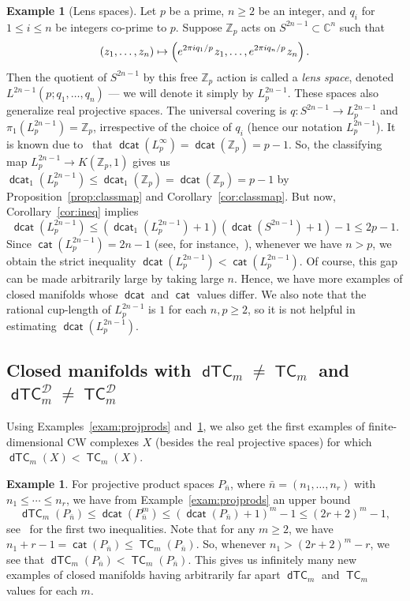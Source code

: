 \documentclass[amscd,amssymb,verbatim,11pt]{amsart}
\theoremstyle{plain}
\theoremstyle{definition}
\newtheorem{ex}[thm]{Example}
\DeclareMathOperator{\cat}{{\mathsf{cat}}}
\DeclareMathOperator{\TC}{{\mathsf{TC}}}
\DeclareMathOperator{\dcat}{{\mathsf{dcat}}}
\DeclareMathOperator{\dTC}{{\mathsf{dTC}}}
\newcommand{\D}{\mathcal{D}}
\def\C{{\mathbb C}}
\def\Z{{\mathbb Z}}
\begin{document}
\begin{ex}[Lens spaces]\label{exam:lens spaces}
Let $p$ be a prime, $n\ge 2$ be an integer, and $q_i$ for $1\le i \le n$ be integers co-prime to $p$. Suppose $\Z_p$ acts on $S^{2n-1}\subset \C^n$ such that
\[
(z_1,\ldots,z_n)\mapsto \left(e^{2\pi iq_1/p}\hspace{0.3mm}z_1,\ldots,e^{2\pi iq_n/p}\hspace{0.3mm}z_n\right).
\]
Then the quotient of $S^{2n-1}$ by this free $\Z_p$ action is called a \emph{lens space}, denoted $L^{2n-1}(p;q_1,\ldots,q_n)$ --- we will denote it simply by $L^{2n-1}_p$. These spaces also generalize real projective spaces. The universal covering is $q\colon S^{2n-1}\to L^{2n-1}_p$ and $\pi_1(L^{2n-1}_p)=\Z_p$, irrespective of the choice of $q_i$ (hence our notation $L^{2n-1}_p$). It is known due to~\cite{Dr,KW2} that $\dcat(L^{\infty}_p)=\dcat(\Z_p)=p-1$. So, the classifying map $L^{2n-1}_p\to K(\Z_p,1)$ gives us $\dcat_1(L^{2n-1}_p)\le \dcat_1(\Z_p)=\dcat(\Z_p)=p-1$ by Proposition~\ref{prop:classmap} and Corollary~\ref{cor:classmap}. But now, Corollary~\ref{cor:ineq} implies
\[
\dcat(L^{2n-1}_p)\le(\dcat_1(L^{2n-1}_p)+1)(\dcat(S^{2n-1})+1)-1\le 2p-1.
\]
Since $\cat(L^{2n-1}_p)=2n-1$ (see, for instance,~\cite[Example 9.29]{CLOT}), whenever 
we have $n>p$, we obtain the strict inequality $\dcat(L^{2n-1}_p)<\cat(L^{2n-1}_p)$. Of course, this gap can be made arbitrarily large by taking large $n$. Hence, we have more examples of closed manifolds whose $\dcat$ and $\cat$ values differ. We also note that the rational cup-length of $L^{2n-1}_p$ is $1$ for each $n,p\ge 2$, so it is not helpful in estimating $\dcat(L^{2n-1}_p)$.
\end{ex}

\subsection{Closed manifolds with $\dTC_m\ne\TC_m$ and $\dTC^{\D}_m\ne \TC^{\D}_m$}\label{subsec: dTC ne TC} 
Using Examples~\ref{exam:projprods} and~\ref{exam:lens spaces}, we also get the first examples of finite-dimensional CW complexes $X$ (besides the real projective spaces) for which $\dTC_m(X)<\TC_m(X)$. 

\begin{ex}\label{exam: dtc and tc differ}
    For projective product spaces $P_{\bar n}$, where $\bar n=(n_1,\ldots,n_r)$ with $n_1\le\cdots\le n_r$, we have from Example~\ref{exam:projprods} an upper bound
    \[
    \dTC_m(P_{\bar n})\le\dcat(P_{\bar n}^m)\le (\dcat(P_{\bar n})+1)^m-1\le (2r+2)^m-1,
    \]
    see~\cite[Section 3]{Ja1} for the first two inequalities. Note that for any $m\ge 2$, we have $n_1+r-1=\cat(P_{\bar n})\le\TC_m(P_{\bar n})$. So, whenever $n_1>(2r+2)^m-r$, we see that $\dTC_m(P_{\bar n})<\TC_m(P_{\bar n})$. This gives us infinitely many new examples of closed manifolds having arbitrarily far apart $\dTC_m$ and $\TC_m$ values for each $m$.
\end{ex}
\end{document}
